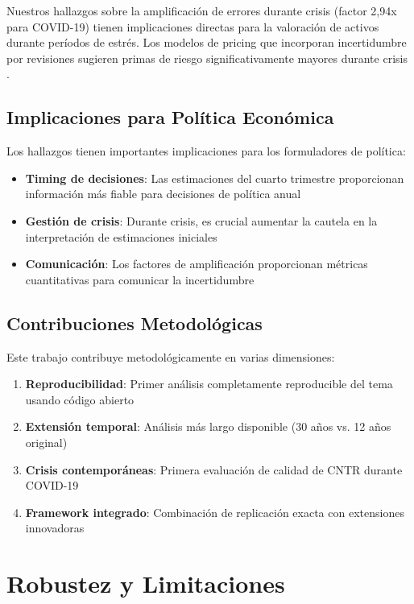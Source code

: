 \documentclass{article}
\begin{document}
Nuestros hallazgos sobre la amplificación de errores durante crisis (factor 2,94x para COVID-19) tienen implicaciones directas para la valoración de activos durante períodos de estrés. Los modelos de pricing que incorporan incertidumbre por revisiones sugieren primas de riesgo significativamente mayores durante crisis \citep{research_journal_2023}.

\subsection{Implicaciones para Política Económica}

Los hallazgos tienen importantes implicaciones para los formuladores de política:

\begin{itemize}
\item \textbf{Timing de decisiones}: Las estimaciones del cuarto trimestre proporcionan información más fiable para decisiones de política anual
\item \textbf{Gestión de crisis}: Durante crisis, es crucial aumentar la cautela en la interpretación de estimaciones iniciales
\item \textbf{Comunicación}: Los factores de amplificación proporcionan métricas cuantitativas para comunicar la incertidumbre
\end{itemize}

\subsection{Contribuciones Metodológicas}

Este trabajo contribuye metodológicamente en varias dimensiones:

\begin{enumerate}
\item \textbf{Reproducibilidad}: Primer análisis completamente reproducible del tema usando código abierto
\item \textbf{Extensión temporal}: Análisis más largo disponible (30 años vs. 12 años original)
\item \textbf{Crisis contemporáneas}: Primera evaluación de calidad de CNTR durante COVID-19
\item \textbf{Framework integrado}: Combinación de replicación exacta con extensiones innovadoras
\end{enumerate}

\section{Robustez y Limitaciones}
\end{document}
